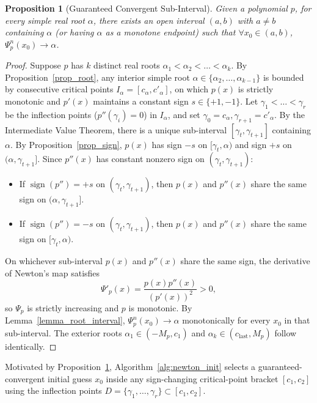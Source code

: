 \documentclass{amsart}
\newtheorem{proposition}{Proposition}
\begin{document}
\begin{proposition}[Guaranteed Convergent Sub-Interval]\label{prop_root_interval}
    Given a polynomial $p$, for every simple real root $\alpha$, there exists an open interval $(a,b)$ with $a \neq b$ containing $\alpha$ (or having $\alpha$ as a monotone endpoint) such that $\forall x_0 \in (a,b)$, $\Psi_p^n(x_0) \to \alpha$.
\end{proposition}
\begin{proof}
    Suppose $p$ has $k$ distinct real roots $\alpha_1 < \alpha_2 < \dots < \alpha_k$. By Proposition~\ref{prop_root}, any interior simple root $\alpha \in \{\alpha_2, \dots, \alpha_{k-1}\}$ is bounded by consecutive critical points $I_\alpha = [c_\alpha, c'_\alpha]$, on which $p(x)$ is strictly monotonic and $p'(x)$ maintains a constant sign $s \in \{+1, -1\}$. Let $\gamma_1 < \dots < \gamma_r$ be the inflection points ($p''(\gamma_i) = 0$) in $I_\alpha$, and set $\gamma_0 = c_\alpha, \gamma_{r+1} = c'_\alpha$. By the Intermediate Value Theorem, there is a unique sub-interval $[\gamma_t, \gamma_{t+1}]$ containing $\alpha$. By Proposition~\ref{prop_sign}, $p(x)$ has sign $-s$ on $[\gamma_t, \alpha)$ and sign $+s$ on $(\alpha, \gamma_{t+1}]$. Since $p''(x)$ has constant nonzero sign on $(\gamma_t, \gamma_{t+1})$:
    \begin{itemize}
        \item If $\operatorname{sign}(p'') = +s$ on $(\gamma_t, \gamma_{t+1})$, then $p(x)$ and $p''(x)$ share the same sign on $(\alpha, \gamma_{t+1}]$.
        \item If $\operatorname{sign}(p'') = -s$ on $(\gamma_t, \gamma_{t+1})$, then $p(x)$ and $p''(x)$ share the same sign on $[\gamma_t, \alpha)$.
    \end{itemize}
    On whichever sub-interval $p(x)$ and $p''(x)$ share the same sign, the derivative of Newton's map satisfies
    \[
        \Psi'_p(x) = \frac{p(x)p''(x)}{(p'(x))^2} > 0,
    \]
    so $\Psi_p$ is strictly increasing and $p$ is monotonic. By Lemma~\ref{lemma_root_interval}, $\Psi_p^n(x_0) \to \alpha$ monotonically for every $x_0$ in that sub-interval. The exterior roots $\alpha_1 \in (-M_p, c_1)$ and $\alpha_k \in (c_{\text{last}}, M_p)$ follow identically.
\end{proof}

Motivated by Proposition~\ref{prop_root_interval}, Algorithm~\ref{alg:newton_init} selects a guaranteed-convergent initial guess $x_0$ inside any sign-changing critical-point bracket $[c_1, c_2]$ using the inflection points $D = \{\gamma_1, \dots, \gamma_r\} \subset [c_1, c_2]$.
\end{document}
